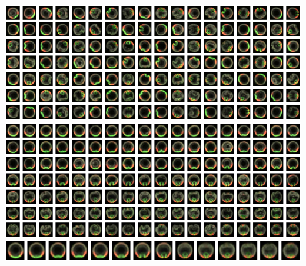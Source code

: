\documentclass[12pt]{minimal}
\begin{document}
\centering
{}
\includegraphics[width=17cm]{fixed_images_unregistered_unordered}\\
\vspace{0.2cm}
\includegraphics[width=17cm]{fixed_images_registered_ordered}\\
\vspace{0.2cm}
\includegraphics[width=17cm]{fixed_images_average_trajectory}
\end{document}
